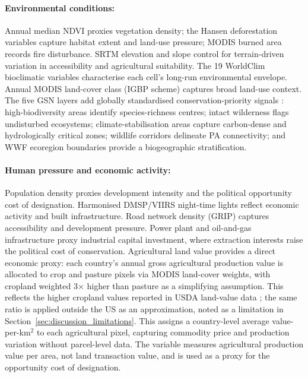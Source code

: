 \documentclass[12pt]{article}
\theoremstyle{break}
\begin{document}
\paragraph{Environmental conditions:}
Annual median NDVI proxies vegetation density; the Hansen deforestation variables
capture habitat extent and land-use pressure; MODIS burned area records fire
disturbance. SRTM elevation and slope control for terrain-driven variation in
accessibility and agricultural suitability. The 19 WorldClim bioclimatic variables
characterise each cell's long-run environmental envelope. Annual MODIS land-cover
class (IGBP scheme) captures broad land-use context. The five GSN layers add
globally standardised conservation-priority signals \citep{dinerstein2020}:
high-biodiversity areas
identify species-richness centres; intact wilderness flags undisturbed ecosystems;
climate-stabilisation areas capture carbon-dense and hydrologically critical zones;
wildlife corridors delineate PA connectivity; and WWF ecoregion boundaries provide
a biogeographic stratification.

\paragraph{Human pressure and economic activity:}
Population density proxies development intensity and the political opportunity cost
of designation. Harmonised DMSP/VIIRS night-time lights reflect economic activity
and built infrastructure. Road network density (GRIP) captures accessibility and
development pressure. Power plant and oil-and-gas infrastructure proxy industrial
capital investment, where extraction interests raise the political cost of
conservation. Agricultural land value provides a direct economic proxy: each
country's annual gross agricultural production value \citep{faostat2024}
is allocated to crop and pasture pixels via MODIS land-cover weights, with cropland
weighted 3$\times$ higher than pasture as a simplifying assumption. This reflects
the higher cropland values reported in USDA land-value data \citep{usdanass2025};
the same ratio is applied outside the US as an approximation, noted as a limitation
in Section~\ref{sec:discussion_limitations}.
This assigns a country-level average value-per-km$^2$ to each agricultural pixel,
capturing commodity price and production variation without parcel-level data.
The variable measures agricultural production value per area, not land
transaction value, and is used as a proxy for the opportunity cost of designation.
\end{document}
